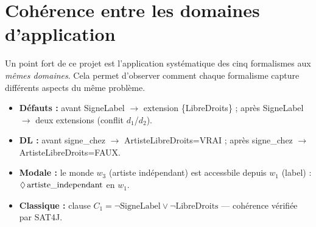 \section{Cohérence entre les domaines d'application}

Un point fort de ce projet est l'application systématique des cinq formalismes
aux \emph{mêmes domaines}. Cela permet d'observer comment chaque formalisme
capture différents aspects du même problème.

\begin{tcolorbox}[resultbox, title={Exemple : Flenn (industrie musicale)}]
\begin{itemize}
  \item \textbf{Défauts :} avant SigneLabel $\to$ extension \{LibreDroits\} ;
        après SigneLabel $\to$ deux extensions (conflit $d_1$/$d_2$).
  \item \textbf{DL :} avant signe\_chez $\to$ ArtisteLibreDroits=VRAI ;
        après signe\_chez $\to$ ArtisteLibreDroits=FAUX.
  \item \textbf{Modale :} le monde $w_3$ (artiste indépendant) est accessbile
        depuis $w_1$ (label) : $\Diamond\,\text{artiste\_independant}$ en $w_1$.
  \item \textbf{Classique :} clause $C_1 = \lnot\text{SigneLabel} \lor
        \lnot\text{LibreDroits}$ — cohérence vérifiée par SAT4J.
\end{itemize}
\end{tcolorbox}
